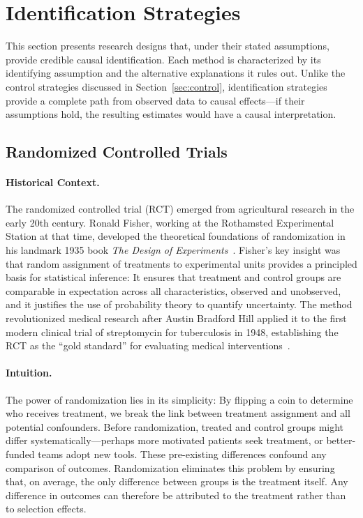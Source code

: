 \section{Identification Strategies}
\label{sec:identification}

This section presents research designs that, under their stated assumptions, provide credible causal identification.
Each method is characterized by its identifying assumption and the alternative explanations it rules out.
Unlike the control strategies discussed in Section~\ref{sec:control}, identification strategies provide a complete path from observed data to causal effects---if their assumptions hold, the resulting estimates would have a causal interpretation.

\subsection{Randomized Controlled Trials}

\paragraph{Historical Context.}
The randomized controlled trial (RCT) emerged from agricultural research in the early 20th century.
Ronald Fisher, working at the Rothamsted Experimental Station at that time, developed the theoretical foundations of randomization in his landmark 1935 book \emph{The Design of Experiments}~\cite{fisher1971design}.
Fisher's key insight was that random assignment of treatments to experimental units provides a principled basis for statistical inference: It ensures that treatment and control groups are comparable in expectation across all characteristics, observed and unobserved, and it justifies the use of probability theory to quantify uncertainty.
The method revolutionized medical research after Austin Bradford Hill applied it to the first modern clinical trial of streptomycin for tuberculosis in 1948, establishing the RCT as the ``gold standard'' for evaluating medical interventions~\cite{bothwell2016assessing}.

\paragraph{Intuition.}
The power of randomization lies in its simplicity: By flipping a coin to determine who receives treatment, we break the link between treatment assignment and all potential confounders.
Before randomization, treated and control groups might differ systematically---perhaps more motivated patients seek treatment, or better-funded teams adopt new tools.
These pre-existing differences confound any comparison of outcomes.
Randomization eliminates this problem by ensuring that, on average, the only difference between groups is the treatment itself.
Any difference in outcomes can therefore be attributed to the treatment rather than to selection effects.

